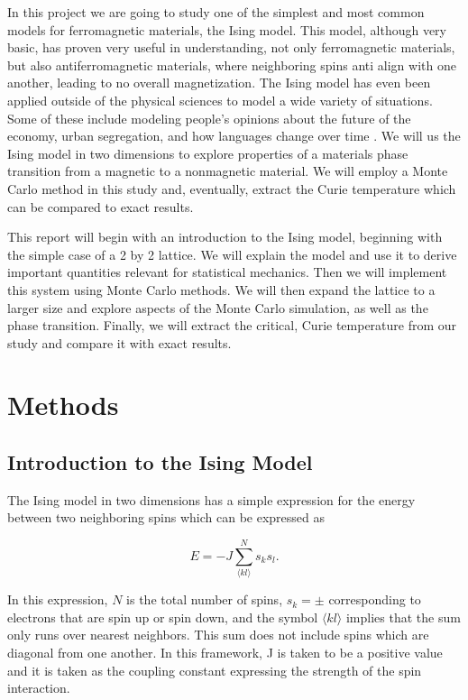 \documentclass[%
oneside,                 %
final,                   %
10pt]{article}
\begin{document}
In this project we are going to study one of the simplest and most common models for ferromagnetic materials, the Ising model.  This model, although very basic, has proven very useful in understanding, not only ferromagnetic materials, but also antiferromagnetic materials, where neighboring spins anti align with one another, leading to no overall magnetization.  The Ising model has even been applied outside of the physical sciences to model a wide variety of situations.  Some of these include modeling people's opinions about the future of the economy, urban segregation, and how languages change over time \cite{otherising}.  We will us the Ising model in two dimensions to explore properties of a materials phase transition from a magnetic to a nonmagnetic material.  We will employ a Monte Carlo method in this study and, eventually, extract the Curie temperature which can be compared to exact results.

This report will begin with an introduction to the Ising model, beginning with the simple case of a 2 by 2 lattice.  We will explain the model and use it to derive important quantities relevant for statistical mechanics.  Then we will implement this system using Monte Carlo methods.  We will then expand the lattice to a larger size and explore aspects of the Monte Carlo simulation, as well as the phase transition.  Finally, we will extract the critical, Curie temperature from our study and compare it with exact results.

\section{Methods}

\subsection{Introduction to the Ising Model}

The Ising model in two dimensions has a simple expression for the energy between two neighboring spins which can be expressed as

\begin{equation*}
E=-J \sum_{\langle k l \rangle}^N s_k s_l.
\end{equation*}

In this expression, $N$ is the total number of spins, $s_k = \pm$ corresponding to electrons that are spin up or spin down, and the symbol $ \langle kl \rangle$ implies that the sum only runs over nearest neighbors.  This sum does not include spins which are diagonal from one another.  In this framework, J is taken to be a positive value and it is taken as the coupling constant expressing the strength of the spin interaction.
\end{document}

